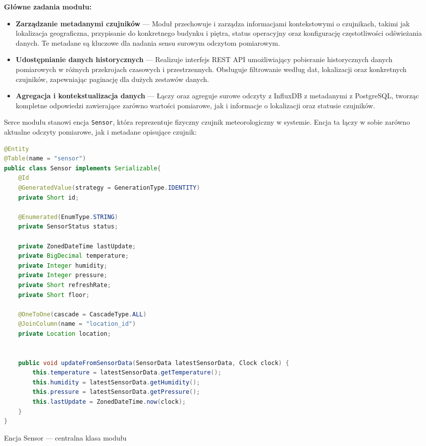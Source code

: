 \documentclass[a4paper,12pt,openany]{book}
\begin{document}
\textbf{Główne zadania modułu:}
\begin{itemize}[itemsep=2pt,topsep=4pt,parsep=0pt]
\item \textbf{Zarządzanie metadanymi czujników} --- Moduł przechowuje i zarządza informacjami kontekstowymi o czujnikach, takimi jak lokalizacja geograficzna, przypisanie do konkretnego budynku i piętra, status operacyjny oraz konfigurację częstotliwości odświeżania danych. Te metadane są kluczowe dla nadania sensu surowym odczytom pomiarowym.

\item \textbf{Udostępnianie danych historycznych} --- Realizuje interfejs REST API umożliwiający pobieranie historycznych danych pomiarowych w różnych przekrojach czasowych i przestrzennych. Obsługuje filtrowanie według dat, lokalizacji oraz konkretnych czujników, zapewniając paginację dla dużych zestawów danych.

\item \textbf{Agregacja i kontekstualizacja danych} --- Łączy oraz agreguje surowe odczyty z InfluxDB z metadanymi z PostgreSQL, tworząc kompletne odpowiedzi zawierające zarówno wartości pomiarowe, jak i informacje o lokalizacji oraz statusie czujników.
\end{itemize}


Serce modułu stanowi encja \texttt{Sensor}, która reprezentuje fizyczny czujnik meteorologiczny w systemie. Encja ta łączy w sobie zarówno aktualne odczyty pomiarowe, jak i metadane opisujące czujnik:

\begin{lstfloat}[H]
\begin{lstlisting}[language=java]
@Entity
@Table(name = "sensor")
public class Sensor implements Serializable{
    @Id
    @GeneratedValue(strategy = GenerationType.IDENTITY)
    private Short id;

    @Enumerated(EnumType.STRING)
    private SensorStatus status;

    private ZonedDateTime lastUpdate;
    private BigDecimal temperature;
    private Integer humidity;
    private Integer pressure;
    private Short refreshRate;
    private Short floor;

    @OneToOne(cascade = CascadeType.ALL)
    @JoinColumn(name = "location_id")
    private Location location;


    public void updateFromSensorData(SensorData latestSensorData, Clock clock) {
        this.temperature = latestSensorData.getTemperature();
        this.humidity = latestSensorData.getHumidity();
        this.pressure = latestSensorData.getPressure();
        this.lastUpdate = ZonedDateTime.now(clock);
    }
}
\end{lstlisting}
\caption{Encja Sensor --- centralna klasa modułu}
\label{lst:sensor-entity}
\end{lstfloat}
\end{document}

